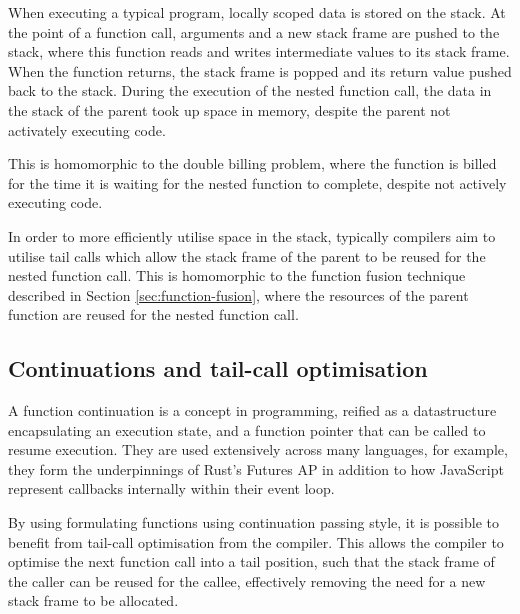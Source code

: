 When executing a typical program, locally scoped data is stored on the stack. At the point of a function call, arguments and a new stack frame are pushed to the stack, where this function reads and writes intermediate values to its stack frame. When the function returns, the stack frame is popped and its return value pushed back to the stack. During the execution of the nested function call, the data in the stack of the parent took up space in memory, despite the parent not activately executing code.

This is homomorphic to the double billing problem, where the function is billed for the time it is waiting for the nested function to complete, despite not actively executing code.

In order to more efficiently utilise space in the stack, typically compilers aim to utilise tail calls which allow the stack frame of the parent to be reused for the nested function call. This is homomorphic to the function fusion technique described in Section \ref{sec:function-fusion}, where the resources of the parent function are reused for the nested function call.

\subsection{Continuations and tail-call optimisation}
A function continuation is a concept in programming\cite{sussmanSCHEMEInterpreterExtended1975}, reified as a datastructure encapsulating an execution state, and a function pointer that can be called to resume execution. They are used extensively across many languages, for example, they form the underpinnings of Rust's Futures AP in addition to how JavaScript represent callbacks internally within their event loop.

By using formulating functions using continuation passing style, it is possible to benefit from tail-call optimisation from the compiler. This allows the compiler to optimise the next function call into a tail position, such that the stack frame of the caller can be reused for the callee, effectively removing the need for a new stack frame to be allocated.


\newpage



